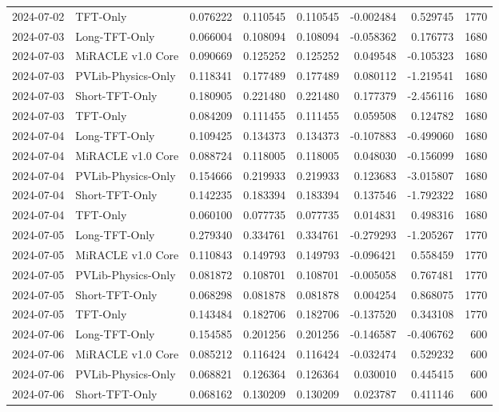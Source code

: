 \begin{tabular}{llrrrrrr}
2024-07-02 & TFT-Only & 0.076222 & 0.110545 & 0.110545 & -0.002484 & 0.529745 & 1770 \\
2024-07-03 & Long-TFT-Only & 0.066004 & 0.108094 & 0.108094 & -0.058362 & 0.176773 & 1680 \\
2024-07-03 & MiRACLE v1.0 Core & 0.090669 & 0.125252 & 0.125252 & 0.049548 & -0.105323 & 1680 \\
2024-07-03 & PVLib-Physics-Only & 0.118341 & 0.177489 & 0.177489 & 0.080112 & -1.219541 & 1680 \\
2024-07-03 & Short-TFT-Only & 0.180905 & 0.221480 & 0.221480 & 0.177379 & -2.456116 & 1680 \\
2024-07-03 & TFT-Only & 0.084209 & 0.111455 & 0.111455 & 0.059508 & 0.124782 & 1680 \\
2024-07-04 & Long-TFT-Only & 0.109425 & 0.134373 & 0.134373 & -0.107883 & -0.499060 & 1680 \\
2024-07-04 & MiRACLE v1.0 Core & 0.088724 & 0.118005 & 0.118005 & 0.048030 & -0.156099 & 1680 \\
2024-07-04 & PVLib-Physics-Only & 0.154666 & 0.219933 & 0.219933 & 0.123683 & -3.015807 & 1680 \\
2024-07-04 & Short-TFT-Only & 0.142235 & 0.183394 & 0.183394 & 0.137546 & -1.792322 & 1680 \\
2024-07-04 & TFT-Only & 0.060100 & 0.077735 & 0.077735 & 0.014831 & 0.498316 & 1680 \\
2024-07-05 & Long-TFT-Only & 0.279340 & 0.334761 & 0.334761 & -0.279293 & -1.205267 & 1770 \\
2024-07-05 & MiRACLE v1.0 Core & 0.110843 & 0.149793 & 0.149793 & -0.096421 & 0.558459 & 1770 \\
2024-07-05 & PVLib-Physics-Only & 0.081872 & 0.108701 & 0.108701 & -0.005058 & 0.767481 & 1770 \\
2024-07-05 & Short-TFT-Only & 0.068298 & 0.081878 & 0.081878 & 0.004254 & 0.868075 & 1770 \\
2024-07-05 & TFT-Only & 0.143484 & 0.182706 & 0.182706 & -0.137520 & 0.343108 & 1770 \\
2024-07-06 & Long-TFT-Only & 0.154585 & 0.201256 & 0.201256 & -0.146587 & -0.406762 & 600 \\
2024-07-06 & MiRACLE v1.0 Core & 0.085212 & 0.116424 & 0.116424 & -0.032474 & 0.529232 & 600 \\
2024-07-06 & PVLib-Physics-Only & 0.068821 & 0.126364 & 0.126364 & 0.030010 & 0.445415 & 600 \\
2024-07-06 & Short-TFT-Only & 0.068162 & 0.130209 & 0.130209 & 0.023787 & 0.411146 & 600 \\

\end{tabular}
